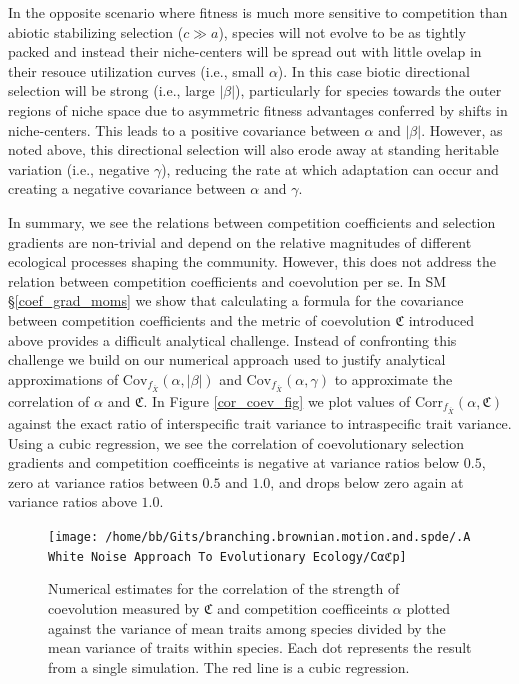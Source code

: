 \documentclass[]{elsarticle} %
\begin{document}
In the opposite scenario where fitness is much more sensitive to
competition than abiotic stabilizing selection (\(c\gg a\)), species
will not evolve to be as tightly packed and instead their niche-centers
will be spread out with little ovelap in their resouce utilization
curves (i.e., small \(\alpha\)). In this case biotic directional
selection will be strong (i.e., large \(|\beta|\)), particularly for
species towards the outer regions of niche space due to asymmetric
fitness advantages conferred by shifts in niche-centers. This leads to a
positive covariance between \(\alpha\) and \(|\beta|\). However, as
noted above, this directional selection will also erode away at standing
heritable variation (i.e., negative \(\gamma\)), reducing the rate at
which adaptation can occur and creating a negative covariance between
\(\alpha\) and \(\gamma\).

In summary, we see the relations between competition coefficients and
selection gradients are non-trivial and depend on the relative
magnitudes of different ecological processes shaping the community.
However, this does not address the relation between competition
coefficients and coevolution per se. In SM \S\ref{coef_grad_moms} we
show that calculating a formula for the covariance between competition
coefficients and the metric of coevolution \(\mathfrak{C}\) introduced
above provides a difficult analytical challenge. Instead of confronting
this challenge we build on our numerical approach used to justify
analytical approximations of
\(\mathrm{Cov}_{f_{\bar X}}(\alpha,|\beta|)\) and
\(\mathrm{Cov}_{f_{\bar X}}(\alpha,\gamma)\) to approximate the
correlation of \(\alpha\) and \(\mathfrak{C}\). In Figure
\ref{cor_coev_fig} we plot values of
\(\mathrm{Corr}_{f_{\bar X}}(\alpha,\mathfrak{C})\) against the exact
ratio of interspecific trait variance to intraspecific trait variance.
Using a cubic regression, we see the correlation of coevolutionary
selection gradients and competition coefficeints is negative at variance
ratios below \(0.5\), zero at variance ratios between \(0.5\) and
\(1.0\), and drops below zero again at variance ratios above \(1.0\).

\begin{figure}

{\centering \texttt{[image: /home/bb/Gits/branching.brownian.motion.and.spde/.A White Noise Approach To Evolutionary Ecology/Cαℭp]} 

}

\caption{\label{cor_coev_fig}Numerical estimates for the correlation of the strength of coevolution measured by $\mathfrak{C}$ and competition coefficeints $\alpha$ plotted against the variance of mean traits among species divided by the mean variance of traits within species. Each dot represents the result from a single simulation. The red line is a cubic regression.}\label{fig:unnamed-chunk-12}
\end{figure}
\end{document}

